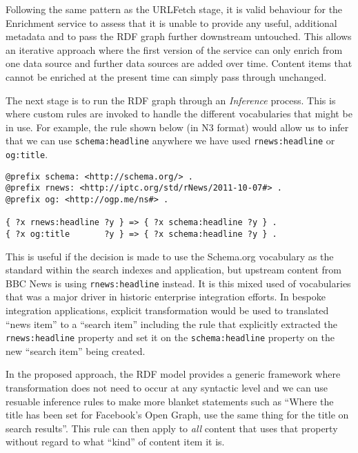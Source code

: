 Following the same pattern as the URLFetch stage, it is valid behaviour
for the Enrichment service to assess that it is unable to provide
any useful, additional metadata and to pass the RDF graph further
downstream untouched. This allows an iterative approach where the first
version of the service can only enrich from one data source and
further data sources are added over time. Content items that cannot be
enriched at the present time can simply pass through unchanged.

The next stage is to run the RDF graph through an \emph{Inference} process.
This is where custom rules are invoked to handle the different
vocabularies that might be in use. For example, the rule shown below
(in N3 format) would allow us to infer that we can
use \texttt{schema:headline} anywhere we have used \texttt{rnews:headline}
or \texttt{og:title}.

\begin{centering}
\begin{lstlisting}[language=ttl]
@prefix schema: <http://schema.org/> .
@prefix rnews: <http://iptc.org/std/rNews/2011-10-07#> .
@prefix og: <http://ogp.me/ns#> .

{ ?x rnews:headline ?y } => { ?x schema:headline ?y } .
{ ?x og:title       ?y } => { ?x schema:headline ?y } .
\end{lstlisting}
\end{centering}

This is useful if the decision is made to use the Schema.org vocabulary as
the standard within the search indexes and application, but upstream
content from BBC News is using \texttt{rnews:headline} instead. It is this
mixed used of vocabularies that was a major driver in historic
enterprise integration efforts. In bespoke integration applications, explicit
transformation would be used to translated  ``news item'' to a
``search item'' including the rule that explicitly extracted the
\texttt{rnews:headline} property and set it on the \texttt{schema:headline}
property on the new ``search item'' being created.

In the proposed approach, the RDF model provides a generic framework where
transformation does not need to occur at any syntactic level and we
can use resuable inference rules to make more blanket statements such as
``Where the title has been set for Facebook's Open Graph, use the same
thing for the title on search results''. This rule can then apply to \emph{all}
content that uses that property without regard to what ``kind'' of content item
it is.

